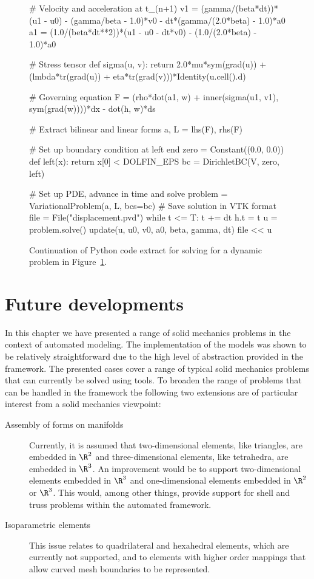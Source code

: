 \begin{figure}
\begin{python}
# Velocity and acceleration at t_(n+1)
v1 = (gamma/(beta*dt))*(u1 - u0) - (gamma/beta - 1.0)*v0 - dt*(gamma/(2.0*beta) - 1.0)*a0
a1 = (1.0/(beta*dt**2))*(u1 - u0 - dt*v0) - (1.0/(2.0*beta) - 1.0)*a0

# Stress tensor
def sigma(u, v):
    return 2.0*mu*sym(grad(u)) + (lmbda*tr(grad(u)) + eta*tr(grad(v)))*Identity(u.cell().d)

# Governing equation
F = (rho*dot(a1, w) + inner(sigma(u1, v1), sym(grad(w))))*dx - dot(h, w)*ds

# Extract bilinear and linear forms
a, L = lhs(F), rhs(F)

# Set up boundary condition at left end
zero = Constant((0.0, 0.0))
def left(x):
    return x[0] < DOLFIN_EPS
bc = DirichletBC(V, zero, left)

# Set up PDE, advance in time and solve
problem = VariationalProblem(a, L, bcs=bc)
# Save solution in VTK format
file = File("displacement.pvd")
while t <= T:
    t += dt
    h.t = t
    u = problem.solve()
    update(u, u0, v0, a0, beta, gamma, dt)
    file << u
\end{python}
\caption{Continuation of Python code extract for solving for a dynamic
problem in Figure~\ref{fig:oelgaard-1:time_ufl_code2}.}
\label{fig:oelgaard-1:time_ufl_code2}
\end{figure}

\section{Future developments}

In this chapter we have presented a range of solid mechanics problems in
the context of automated modeling.  The implementation of the models
was shown to be relatively straightforward due to the high level of
abstraction provided in the \fenics framework.  The presented cases
cover a range of typical solid mechanics problems that can currently be
solved using \fenics tools.  To broaden the range of problems that can
be handled in the \fenics framework the following two extensions are of
particular interest from a solid mechanics viewpoint:
\begin{description}
\item [Assembly of forms on manifolds] Currently, it is assumed that
two-dimensional elements, like triangles, are embedded in $\R^2$ and
three-dimensional elements, like tetrahedra, are embedded in $\R^3$.
An improvement would be to support two-dimensional elements embedded
in $\R^3$ and one-dimensional elements embedded in $\R^2$ or $\R^3$.
This would, among other things, provide support for shell and truss
problems within the automated framework.

\item [Isoparametric elements] This issue relates to quadrilateral
and hexahedral elements, which are currently not supported, and to
elements with higher order mappings that allow curved mesh boundaries
to be represented.
\end{description}
